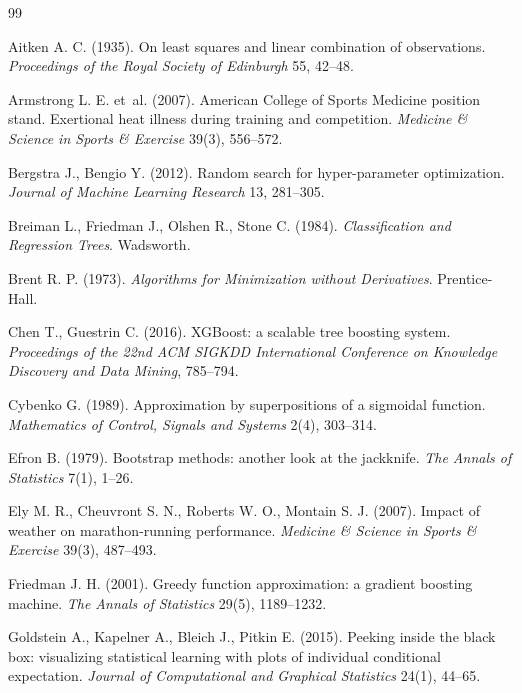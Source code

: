 \documentclass[11pt,a4paper]{article}
\begin{document}
\begin{thebibliography}{99}

Aitken A. C. (1935). On least squares and linear combination of observations. \emph{Proceedings of the Royal Society
of Edinburgh} 55, 42--48.

Armstrong L. E. et~al. (2007). American College of
Sports Medicine position stand. Exertional heat illness during training and competition. \emph{Medicine \& Science in
Sports \& Exercise} 39(3), 556--572.

Bergstra J., Bengio Y. (2012). Random search for hyper-parameter optimization. \emph{Journal of Machine Learning
Research} 13, 281--305.

Breiman L., Friedman J., Olshen R., Stone C. (1984). \emph{Classification and Regression Trees}. Wadsworth.

Brent R. P. (1973). \emph{Algorithms for Minimization without Derivatives}. Prentice-Hall.

Chen T., Guestrin C. (2016). XGBoost: a scalable tree boosting system. \emph{Proceedings of the 22nd ACM SIGKDD
International Conference on Knowledge Discovery and Data Mining}, 785--794.

Cybenko G. (1989). Approximation by superpositions of a sigmoidal function. \emph{Mathematics of Control, Signals and
Systems} 2(4), 303--314.

Efron B. (1979). Bootstrap methods: another look at the jackknife. \emph{The Annals of Statistics} 7(1), 1--26.

Ely M. R., Cheuvront S. N., Roberts W. O., Montain S. J. (2007). Impact of weather on marathon-running performance.
\emph{Medicine \& Science in Sports \& Exercise} 39(3), 487--493.

Friedman J. H. (2001). Greedy function approximation: a gradient boosting machine. \emph{The Annals of Statistics}
29(5), 1189--1232.

Goldstein A., Kapelner A., Bleich J., Pitkin E. (2015). Peeking inside the black box: visualizing statistical learning
with plots of individual conditional expectation. \emph{Journal of Computational and Graphical Statistics} 24(1),
44--65.


\end{thebibliography}
\end{document}
